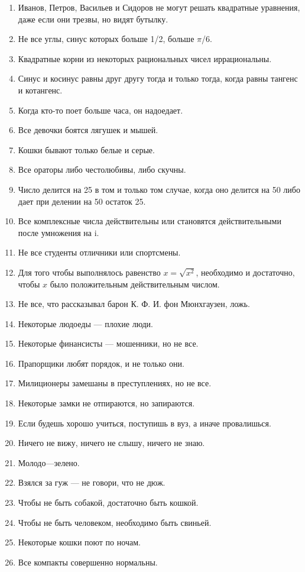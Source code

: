 \documentclass[12pt]{extreport}
\begin{document}
\begin{enumerate}
\item Иванов, Петров, Васильев и Сидоров не могут решать квадратные уравнения, даже если они трезвы, но видят бутылку.
\item Не все углы, синус которых больше 1/2, больше $\pi$/6.
\item Квадратные корни из некоторых рациональных чисел иррациональны.
\item Синус и косинус равны друг другу тогда и только тогда, когда равны тангенс и котангенс.
\item  Когда кто-то поет больше часа, он надоедает.
\item Все девочки боятся лягушек и мышей.
\item Кошки бывают только белые и серые.
\item  Все ораторы либо честолюбивы, либо скучны.
\item Число делится на 25 в том и только том случае, когда оно делится на 50 либо дает при делении на 50 остаток 25.
\item Все комплексные числа действительны или становятся действительными после умножения на i.
\item Не все студенты отличники или спортсмены.
\item Для того чтобы выполнялось равенство $x = \sqrt{x^2}$, необходимо и достаточно, чтобы $x$ было положительным действительным числом.
\item Не все, что рассказывал барон К. Ф. И. фон Мюнхгаузен, ложь.
\item Некоторые людоеды — плохие люди.
\item Некоторые финансисты — мошенники, но не все.
\item Прапорщики любят порядок, и не только они.
\item Милиционеры замешаны в преступлениях, но не все.
\item Некоторые замки не отпираются, но запираются.
\item Если будешь хорошо учиться, поступишь в вуз, а иначе
провалишься.
\item Ничего не вижу, ничего не слышу, ничего не знаю.
\item Молодо—зелено.
\item Взялся за гуж --- не говори, что не дюж.
\item Чтобы не быть собакой, достаточно быть кошкой.
\item Чтобы не быть человеком, необходимо быть свиньей.
\item Некоторые кошки поют по ночам.
\item Все компакты совершенно нормальны.

\end{enumerate}
\end{document}

